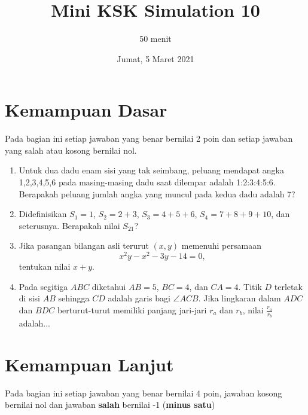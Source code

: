 \documentclass[12pt]{scrartcl}
\title{Mini KSK Simulation 10}
\author{50 menit}
\date{Jumat, 5 Maret 2021}
\begin{document}
	\maketitle

\renewcommand*\contentsname{Daftar Isi}
\tableofcontents

\newpage
	
	\section{Kemampuan Dasar}
	Pada bagian ini setiap jawaban yang benar bernilai 2 poin dan setiap jawaban yang salah
	atau kosong bernilai nol.
	\begin{enumerate}
		\item Untuk dua dadu enam sisi yang tak seimbang, peluang mendapat angka 1,2,3,4,5,6 pada masing-masing dadu saat dilempar adalah 1:2:3:4:5:6. Berapakah peluang jumlah angka yang muncul pada kedua dadu adalah 7?
		
		\item 
		Didefinisikan $S_1 = 1$, $S_2 = 2+3$, $S_3 = 4+5+6$, $S_4 = 7+8+9+10$, dan seterusnya. Berapakah nilai $S_{21}$?
		
		\item Jika pasangan bilangan asli terurut $(x,y)$ memenuhi persamaan $$x^2y-x^2-3y-14=0,$$ tentukan nilai $x+y$.
		
		\item Pada segitiga $ABC$ diketahui $AB = 5$, $BC = 4$, dan $CA = 4$. Titik $D$ terletak di sisi $AB$ sehingga $CD$ adalah garis bagi $\angle ACB$. Jika lingkaran dalam $ADC$ dan $BDC$ berturut-turut memiliki panjang jari-jari $r_a$ dan $r_b$, nilai $\frac{r_a}{r_b}$ adalah...
	\end{enumerate}

\section{Kemampuan Lanjut}
Pada bagian ini setiap jawaban yang benar bernilai 4 poin, jawaban kosong bernilai nol
dan jawaban \textbf{salah} bernilai -1 (\textbf{minus satu})
\end{document}
